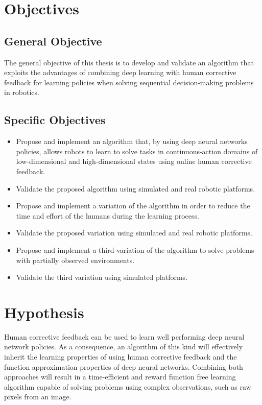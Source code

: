 \section{Objectives}
\subsection{General Objective}
The general objective of this thesis is to develop and validate an algorithm that exploits the advantages of combining deep learning with human corrective feedback for learning policies when solving sequential decision-making problems in robotics. 

\subsection{Specific Objectives}

\begin{itemize}
    \item Propose and implement an algorithm that, by using deep neural networks policies, allows robots to learn to solve tasks in continuous-action domains of low-dimensional and high-dimensional states using online human corrective feedback. 
    \item Validate the proposed algorithm using simulated and real robotic platforms.
    \item Propose and implement a variation of the algorithm in order to reduce the time and effort of the humans during the learning process.
    \item Validate the proposed variation using simulated and real robotic platforms.
    \item Propose and implement a third variation of the algorithm to solve problems with partially observed environments.
    \item Validate the third variation using simulated platforms.
\end{itemize}

\newpage

\section{Hypothesis}
Human corrective feedback can be used to learn well performing deep neural network policies. As a consequence, an algorithm of this kind will effectively inherit the learning properties of using human corrective feedback and the function approximation properties of deep neural networks. Combining both approaches will result in a time-efficient and reward function free learning algorithm capable of solving problems using complex observations, such as raw pixels from an image.

